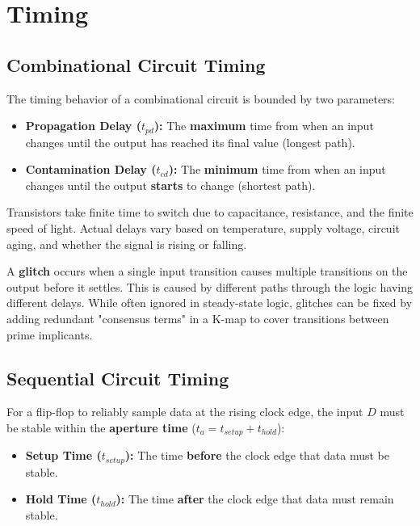 \section{Timing}

\subsection{Combinational Circuit Timing}

\begin{definition}
The timing behavior of a combinational circuit is bounded by two parameters:
\begin{itemize}
    \item \textbf{Propagation Delay ($t_{pd}$):} The \textbf{maximum} time from when an input changes until the output has reached its final value (longest path).
    \item \textbf{Contamination Delay ($t_{cd}$):} The \textbf{minimum} time from when an input changes until the output \textbf{starts} to change (shortest path).
\end{itemize}
\end{definition}

\begin{remark}
Transistors take finite time to switch due to capacitance, resistance, and the finite speed of light. Actual delays vary based on temperature, supply voltage, circuit aging, and whether the signal is rising or falling.
\end{remark}

\begin{example}
A \textbf{glitch} occurs when a single input transition causes multiple transitions on the output before it settles. This is caused by different paths through the logic having different delays. While often ignored in steady-state logic, glitches can be fixed by adding redundant "consensus terms" in a K-map to cover transitions between prime implicants.
\end{example}

\subsection{Sequential Circuit Timing}

\begin{definition}
For a flip-flop to reliably sample data at the rising clock edge, the input $D$ must be stable within the \textbf{aperture time} ($t_a = t_{setup} + t_{hold}$):
\begin{itemize}
    \item \textbf{Setup Time ($t_{setup}$):} The time \textbf{before} the clock edge that data must be stable.
    \item \textbf{Hold Time ($t_{hold}$):} The time \textbf{after} the clock edge that data must remain stable.
\end{itemize}
\end{definition}

